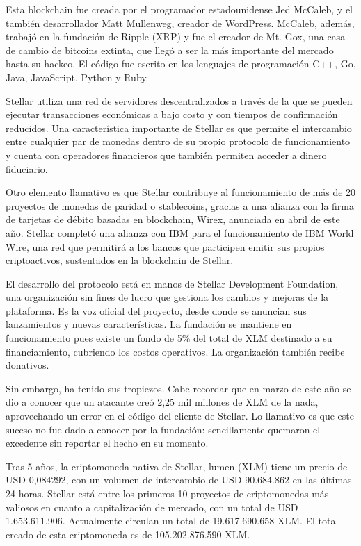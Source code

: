 \documentclass[a4paper,12pt]{/home/armando/Documentos/Cursos/LaTeX/Plantillas/lib/pub}
\begin{document}
	Esta blockchain fue creada por el programador estadounidense Jed McCaleb, y el también desarrollador Matt Mullenweg, creador de WordPress. McCaleb, además, trabajó en la fundación de Ripple (XRP) y fue el creador de Mt. Gox, una casa de cambio de bitcoins extinta, que llegó a ser la más importante del mercado hasta su hackeo. El código fue escrito en los lenguajes de programación C++, Go, Java, JavaScript, Python y Ruby.
	
	Stellar utiliza una red de servidores descentralizados a través de la que se pueden ejecutar transacciones económicas a bajo costo y con tiempos de confirmación reducidos. Una característica importante de Stellar es que permite el intercambio entre cualquier par de monedas dentro de su propio protocolo de funcionamiento y cuenta con operadores financieros que también permiten acceder a dinero fiduciario.
	
	Otro elemento llamativo es que Stellar contribuye al funcionamiento de más de 20 proyectos de monedas de paridad o stablecoins, gracias a una alianza con la firma de tarjetas de débito basadas en blockchain, Wirex, anunciada en abril de este año. Stellar completó una alianza con IBM para el funcionamiento de IBM World Wire, una red que permitirá a los bancos que participen emitir sus propios criptoactivos, sustentados en la blockchain de Stellar.
	
	El desarrollo del protocolo está en manos de Stellar Development Foundation, una organización sin fines de lucro que gestiona los cambios y mejoras de la plataforma. Es la voz oficial del proyecto, desde donde se anuncian sus lanzamientos y nuevas características. La fundación se mantiene en funcionamiento pues existe un fondo de 5\% del total de XLM destinado a su financiamiento, cubriendo los costos operativos. La organización también recibe donativos.
	
	Sin embargo, ha tenido sus tropiezos. Cabe recordar que en marzo de este año se dio a conocer que un atacante creó 2,25 mil millones de XLM de la nada, aprovechando un error en el código del cliente de Stellar. Lo llamativo es que este suceso no fue dado a conocer por la fundación: sencillamente quemaron el excedente sin reportar el hecho en su momento.
	
	Tras 5 años, la criptomoneda nativa de Stellar, lumen (XLM) tiene un precio de USD 0,084292, con un volumen de intercambio de USD 90.684.862 en las últimas 24 horas. Stellar está entre los primeros 10 proyectos de criptomonedas más valiosos en cuanto a capitalización de mercado, con un total de USD 1.653.611.906. Actualmente circulan un total de 19.617.690.658 XLM. El total creado de esta criptomoneda es de 105.202.876.590 XLM.
\end{document}
